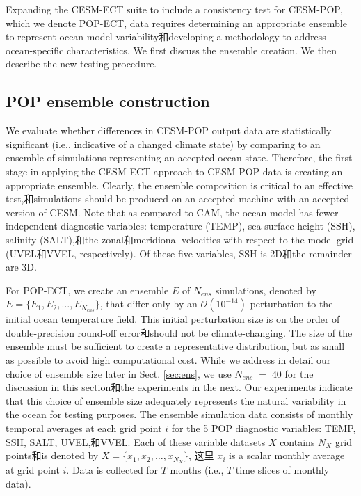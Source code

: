 Expanding the CESM-ECT suite to include a consistency test for CESM-POP, which we denote POP-ECT, data requires determining an appropriate ensemble to represent ocean model variability和developing a methodology to address ocean-specific characteristics. We first discuss the ensemble creation. We then describe the new testing procedure.

\subsection{POP ensemble construction}\label{sec:ensemble}

We evaluate whether differences in CESM-POP output data are statistically significant (i.e., indicative of a changed climate state) by comparing to an ensemble of simulations representing an accepted ocean state.  Therefore, the first stage in applying the CESM-ECT approach to CESM-POP data is creating an appropriate ensemble. Clearly, the ensemble composition is critical to an effective test,和simulations should be produced on an accepted machine with an accepted version of CESM.  Note that as compared to CAM, the ocean model has fewer independent diagnostic variables: temperature (TEMP), sea surface height (SSH), salinity (SALT),和the zonal和meridional velocities with respect to the model grid (UVEL和VVEL, respectively).  Of these five variables, SSH is 2D和the remainder are 3D.

For POP-ECT, we create an ensemble $E$ of $N_{ens}$ simulations, denoted by $E =\{E_1, E_2, \dots, E_{N_{ens}} \}$, that differ only by an $\mathcal{O}(10^{-14})$ perturbation to the initial ocean temperature field.  This initial perturbation size is on the order of double-precision round-off error和should not be climate-changing.
The size of the ensemble must be sufficient to create a representative distribution, but as small as possible to avoid high computational cost.  While we address in detail our choice of ensemble size later in Sect. \ref{sec:ens}, we use $N_{ens} \;=\; 40$ for the discussion in this section和the experiments in the next.  Our experiments indicate that this choice of ensemble size adequately represents the natural variability in the ocean for testing purposes.  The ensemble simulation data consists of monthly temporal averages at each grid point $i$ for the 5 POP diagnostic variables: TEMP, SSH, SALT, UVEL,和VVEL.  Each of these variable datasets $X$ contains $N_X$ grid points和is denoted by ${X} = \{ x_1, x_2, \dots, x_{N_X}\}$, 这里 $x_i$ is a scalar monthly average at grid point $i$.  Data is collected for $T$ months (i.e., $T$ time slices of monthly data).


